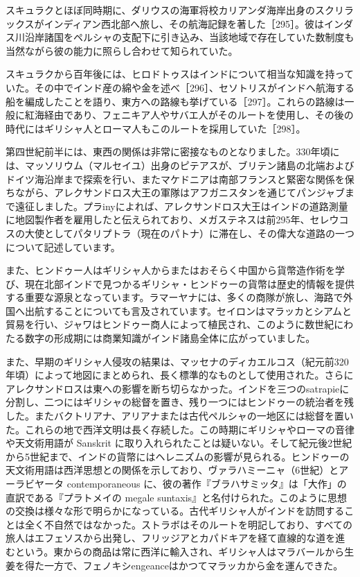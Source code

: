\documentclass[a4paper,11pt,openany]{ltjsbook}
\begin{document}
スキュラクとほぼ同時期に、ダリウスの海軍将校カリアンダ海岸出身のスクリラックスがインディアン西北部へ旅し、その航海記録を著した［295］。彼はインダス川沿岸諸国をペルシャの支配下に引き込み、当該地域で存在していた数制度も当然ながら彼の能力に照らし合わせて知られていた。

スキュラクから百年後には、ヒロドトゥスはインドについて相当な知識を持っていた。その中でインド産の綿や金を述べ［296］、セソトリスがインドへ航海する船を編成したことを語り、東方への路線も挙げている［297］。これらの路線は一般に紅海経由であり、フェニキア人やサバエ人がそのルートを使用し、その後の時代にはギリシャ人とローマ人もこのルートを採用していた［298］。

第四世紀前半には、東西の関係は非常に密接なものとなりました。330年頃には、マッソリウム（マルセイユ）出身のピテアスが、ブリテン諸島の北端およびドイツ海沿岸まで探索を行い、またマケドニアは南部フランスと緊密な関係を保ちながら、アレクサンドロス大王の軍隊はアフガニスタンを通じてパンジャブまで遠征しました。プラinyによれば、アレクサンドロス大王はインドの道路測量に地図製作者を雇用したと伝えられており、メガステネスは前295年、セレウコスの大使としてパタリプトラ（現在のパトナ）に滞在し、その偉大な道路の一つについて記述しています。

また、ヒンドゥー人はギリシャ人からまたはおそらく中国から貨幣造作術を学び、現在北部インドで見つかるギリシャ・ヒンドゥーの貨幣は歴史的情報を提供する重要な源泉となっています。ラマーヤナには、多くの商隊が旅し、海路で外国へ出航することについても言及されています。セイロンはマラッカとシアムと貿易を行い、ジャワはヒンドゥー商人によって植民され、このように数世紀にわたる数字の形成期には商業知識がインド諸島全体に広がっていました。

また、早期のギリシャ人侵攻の結果は、マッセナのディカエルコス（紀元前320年頃）によって地図にまとめられ、長く標準的なものとして使用された。さらにアレクサンドロスは東への影響を断ち切らなかった。インドを三つのsatrapieに分割し、二つにはギリシャの総督を置き、残り一つにはヒンドゥーの統治者を残した。またバクトリアナ、アリアナまたは古代ペルシャの一地区には総督を置いた。これらの地で西洋文明は長く存続した。この時期にギリシャやローマの音律や天文術用語が Sanskrit に取り入れられたことは疑いない。そして紀元後2世紀から5世紀まで、インドの貨幣にはヘレニズムの影響が見られる。ヒンドゥーの天文術用語は西洋思想との関係を示しており、ヴァラハミーニャ（6世紀）とアーラビヤータ contemporaneous に、彼の著作『ブラハサミッタ』は「大作」の直訳である『プラトメイの megale suntaxis』と名付けられた。このように思想の交換は様々な形で明らかになっている。古代ギリシャ人がインドを訪問することは全く不自然ではなかった。ストラボはそのルートを明記しており、すべての旅人はエフェソスから出発し、フリッジアとカパドキアを経て直線的な道を進むという。東からの商品は常に西洋に輸入され、ギリシャ人はマラバールから生姜を得た一方で、フェノキシengeanceはかつてマラッカから金を運んできた。
\end{document}
